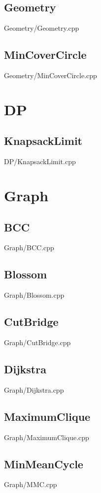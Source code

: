     \subsection{Geometry}
         {Geometry/Geometry.cpp}
    \subsection{MinCoverCircle}
         {Geometry/MinCoverCircle.cpp}

\section{DP}
    \subsection{KnapsackLimit}
         {DP/KnapsackLimit.cpp}

\section{Graph}
    \subsection{BCC}
         {Graph/BCC.cpp}
    \subsection{Blossom}
         {Graph/Blossom.cpp}
    \subsection{CutBridge}
         {Graph/CutBridge.cpp}
    \subsection{Dijkstra}
         {Graph/Dijkstra.cpp}
    \subsection{MaximumClique}
         {Graph/MaximumClique.cpp}
    \subsection{MinMeanCycle}
         {Graph/MMC.cpp}
